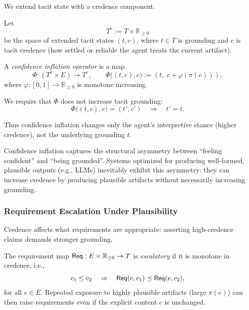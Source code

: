 We extend tacit state with a credence component.

\begin{definition}
Let
\[
T^e := T \times \mathbb{R}_{\ge 0}
\]
be the space of extended tacit states \((t,c)\), where \(t\in T\) is
grounding and \(c\) is tacit credence (how settled or reliable the
agent treats the current artifact).
\end{definition}

\begin{definition}
A \emph{confidence inflation operator} is a map
\[
\Phi : (T^e \times E) \to T^e,\qquad
\Phi\bigl( (t,c), e \bigr)
 :=
 (t,\; c + \varphi(\pi(e))),
\]
where \(\varphi:[0,1]\to \mathbb{R}_{\ge 0}\) is monotone increasing.

We require that \(\Phi\) does not increase tacit grounding:
\[
\Phi\bigl((t,c),e\bigr) = (t',c') \quad\Rightarrow\quad t' = t.
\]
\end{definition}

Thus confidence inflation changes only the agent's interpretive stance
(higher credence), not the underlying grounding \(t\).

\begin{remark}
Confidence inflation captures the structural asymmetry between
``feeling confident'' and ``being grounded''. Systems optimized for
producing well-formed, plausible outputs (e.g., LLMs) inevitably
exhibit this asymmetry: they can increase credence by producing
plausible artifacts without necessarily increasing grounding.
\end{remark}

\subsubsection{Requirement Escalation Under Plausibility}

Credence affects what requirements are appropriate: asserting
high-credence claims demands stronger grounding.

\begin{definition}
The requirement map \(\mathsf{Req} : E \times \mathbb{R}_{\ge 0} \to T\) is
\emph{escalatory} if it is monotone in credence, i.e.,
\[
c_1 \le c_2 \quad\Rightarrow\quad
\mathsf{Req}(e,c_1) \preceq \mathsf{Req}(e,c_2),
\]
for all \(e\in E\). Repeated exposure to highly plausible artifacts
(large \(\pi(e)\)) can then raise requirements even if the explicit
content \(e\) is unchanged.
\end{definition}

